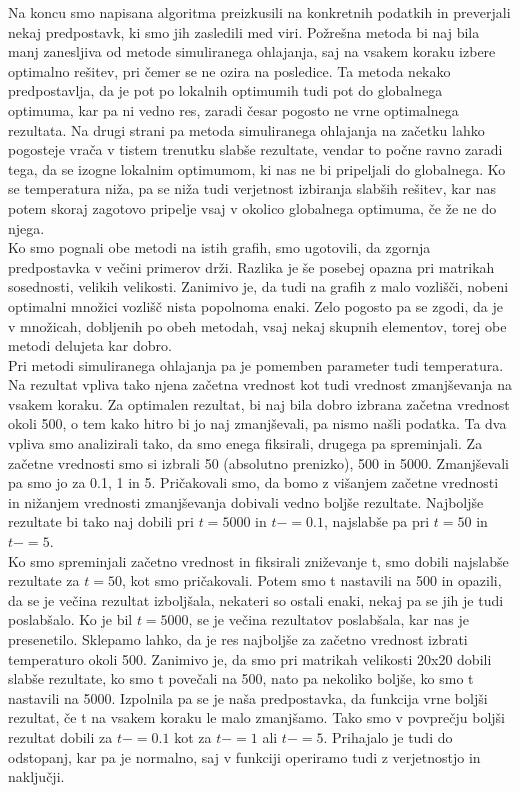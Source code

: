\documentclass[12pt,a4paper]{amsart}
\theoremstyle{definition} %
\theoremstyle{plain} %
\begin{document}
Na koncu smo napisana algoritma preizkusili na konkretnih podatkih in preverjali nekaj predpostavk, ki smo jih zasledili med viri. Požrešna metoda bi naj bila manj zanesljiva od metode simuliranega ohlajanja, saj na vsakem koraku izbere optimalno rešitev, pri čemer se ne ozira na posledice. Ta metoda nekako predpostavlja, da je pot po lokalnih optimumih tudi pot do globalnega optimuma, kar pa ni vedno res, zaradi česar pogosto ne vrne optimalnega rezultata. Na drugi strani pa metoda simuliranega ohlajanja na začetku lahko pogosteje vrača v tistem trenutku slabše rezultate, vendar to počne ravno zaradi tega, da se izogne lokalnim optimumom, ki nas ne bi pripeljali do globalnega. Ko se temperatura niža, pa se niža tudi verjetnost izbiranja slabših rešitev, kar nas potem skoraj zagotovo pripelje vsaj v okolico globalnega optimuma, če že ne do njega. \\
Ko smo pognali obe metodi na istih grafih, smo ugotovili, da zgornja predpostavka v večini primerov drži. Razlika je še posebej opazna pri matrikah sosednosti, velikih velikosti. Zanimivo je, da tudi na grafih z malo vozlišči, nobeni optimalni množici vozlišč nista popolnoma enaki. Zelo pogosto pa se zgodi, da je v množicah, dobljenih po obeh metodah, vsaj nekaj skupnih elementov, torej obe metodi delujeta kar dobro. \\
Pri metodi simuliranega ohlajanja pa je pomemben parameter tudi temperatura. Na rezultat vpliva tako njena začetna vrednost kot tudi vrednost zmanjševanja na vsakem koraku. Za optimalen rezultat, bi naj bila dobro izbrana začetna vrednost okoli 500, o tem kako hitro bi jo naj zmanjševali, pa nismo našli podatka. Ta dva vpliva smo analizirali tako, da smo enega fiksirali, drugega pa spreminjali. Za začetne vrednosti smo si izbrali 50 (absolutno prenizko), 500 in 5000. Zmanjševali pa smo jo za 0.1, 1 in 5. Pričakovali smo, da bomo z višanjem začetne vrednosti in nižanjem vrednosti zmanjševanja dobivali vedno boljše rezultate. Najboljše rezultate bi tako naj dobili pri $t=5000$ in $t -=0.1$, najslabše pa pri $t=50$ in $t -=5$. \\
Ko smo spreminjali začetno vrednost in fiksirali zniževanje t, smo dobili najslabše rezultate za $t=50$, kot smo pričakovali. Potem smo t nastavili na 500 in opazili, da se je večina rezultat izboljšala, nekateri so ostali enaki, nekaj pa se jih je tudi poslabšalo. Ko je bil $t=5000$, se je večina rezultatov poslabšala, kar nas je presenetilo. Sklepamo lahko, da je res najboljše za začetno vrednost izbrati temperaturo okoli 500. Zanimivo je, da smo pri matrikah velikosti 20x20 dobili slabše rezultate, ko smo t povečali na 500, nato pa nekoliko boljše, ko smo t nastavili na 5000. Izpolnila pa se je naša predpostavka, da funkcija vrne boljši rezultat, če t na vsakem koraku le malo zmanjšamo. Tako smo v povprečju boljši rezultat dobili za $t -=0.1$ kot za $t -=1$ ali $t -=5$. Prihajalo je tudi do odstopanj, kar pa je normalno, saj v funkciji operiramo tudi z verjetnostjo in naključji. \\
\end{document}
